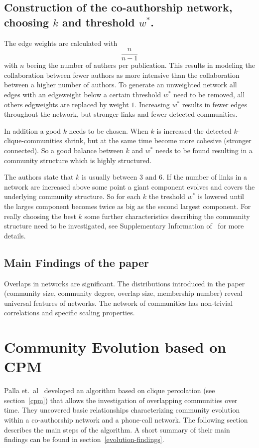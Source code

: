 \documentclass[runningheads,a4paper]{llncs}
\begin{document}
\subsection{Construction of the co-authorship network, choosing $k$ and threshold $w^*$.}
\label{cpm-construction}
The edge weights are calculated with $$\frac{n}{n-1}$$ with $n$ beeing the number of authers per publication.
This results in modeling the collaboration between fewer authors as more intensive than the collaboration between a higher number of authors.  
To generate an unweighted network all edges with an edgeweight below a certain threshold $w^*$ need to be removed, all others edgweights are replaced by weight $1$. Increasing $w^*$ results in fewer edges throughout the network, but stronger links and fewer detected communities.

In addition a good $k$ needs to be chosen. When $k$ is increased the detected $k$-clique-communities shrink, but at the same time become more cohesive (stronger connected).
So a good balance between $k$ and $w^*$ needs to be found resulting in a community structure which is highly structured.

The authors state that $k$ is usually between $3$ and $6$.
If the number of links in a network are increased above some point a giant component evolves and covers the underlying community structure.
So for each $k$ the treshold $w^*$ is lowered until the larges component becomes twice as big as the second largest component. For really choosing the best $k$ some further characteristics describing the community structure need to be investigated, see Supplementary Information of~\cite{palla2005uncovering} for more details.

\subsection{Main Findings of the paper}
Overlaps in networks are significant. The distributions introduced in the paper (community size, community degree, overlap size, membership number) reveal universal features of networks. The network of communities has non-trivial correlations and specific scaling properties.~\cite{palla2005uncovering}

\section{Community Evolution based on CPM}
\label{evolution}
Palla et.~al~\cite{palla2007quantifying} developed an algorithm based on clique percolation (see section~\ref{cpm}) that allows the investigation of overlapping communities over time. They uncovered basic relationships characterizing community evolution within a co-authorship network and a phone-call network. The following section describes the main steps of the algorithm. A short summary of their main findings can be found in section~\ref{evolution-findings}.
\end{document}
